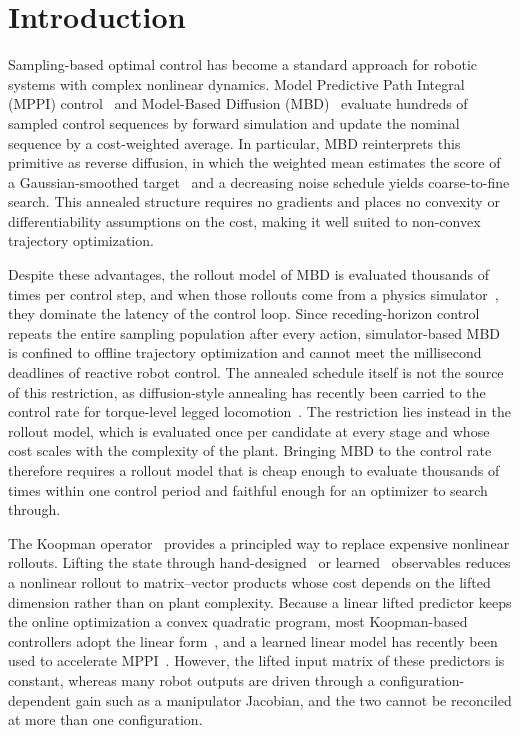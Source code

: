 \documentclass[letterpaper,10pt,conference]{ieeeconf}
\begin{document}
\section{Introduction}\label{sec:intro}
Sampling-based optimal control has become a standard approach for robotic systems with complex nonlinear dynamics.
Model Predictive Path Integral (MPPI) control~\cite{kappen2005, theodorou2010, williams2017mppi, williams2016aggressive} and Model-Based Diffusion (MBD)~\cite{pan2024model} evaluate hundreds of sampled control sequences by forward simulation and update the nominal sequence by a cost-weighted average.
In particular, MBD reinterprets this primitive as reverse diffusion, in which the weighted mean estimates the score of a Gaussian-smoothed target~\cite{song2019generative, song2020score} and a decreasing noise schedule yields coarse-to-fine search.
This annealed structure requires no gradients and places no convexity or differentiability assumptions on the cost, making it well suited to non-convex trajectory optimization.

Despite these advantages, the rollout model of MBD is evaluated thousands of times per control step, and when those rollouts come from a physics simulator~\cite{pan2024model}, they dominate the latency of the control loop.
Since receding-horizon control repeats the entire sampling population after every action, simulator-based MBD is confined to offline trajectory optimization and cannot meet the millisecond deadlines of reactive robot control.
The annealed schedule itself is not the source of this restriction, as diffusion-style annealing has recently been carried to the control rate for torque-level legged locomotion~\cite{xue2025full}.
The restriction lies instead in the rollout model, which is evaluated once per candidate at every stage and whose cost scales with the complexity of the plant.
Bringing MBD to the control rate therefore requires a rollout model that is cheap enough to evaluate thousands of times within one control period and faithful enough for an optimizer to search through.

The Koopman operator~\cite{koopman1931, mezic2005} provides a principled way to replace expensive nonlinear rollouts.
Lifting the state through hand-designed~\cite{williams2015edmd, proctor2016dmdc} or learned~\cite{lusch2018deep} observables reduces a nonlinear rollout to matrix--vector products whose cost depends on the lifted dimension rather than on plant complexity.
Because a linear lifted predictor keeps the online optimization a convex quadratic program, most Koopman-based controllers adopt the linear form~\cite{korda2018mpc, strasser2026}, and a learned linear model has recently been used to accelerate MPPI~\cite{mppidk2026}.
However, the lifted input matrix of these predictors is constant, whereas many robot outputs are driven through a configuration-dependent gain such as a manipulator Jacobian, and the two cannot be reconciled at more than one configuration.
\end{document}
